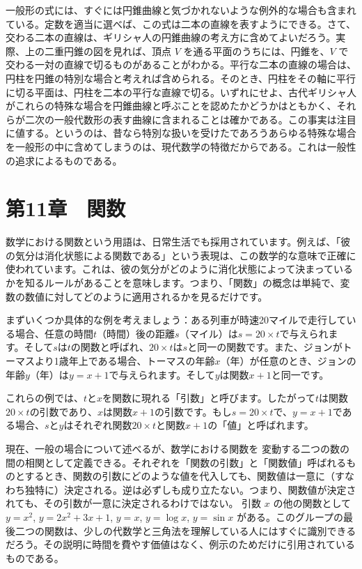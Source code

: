 \documentclass[a4paper,11pt,openany]{ltjsbook}
\begin{document}
一般形の式には、すぐには円錐曲線と気づかれないような例外的な場合も含まれている。定数を適当に選べば、この式は二本の直線を表すようにできる。さて、交わる二本の直線は、ギリシャ人の円錐曲線の考え方に含めてよいだろう。実際、上の二重円錐の図を見れば、頂点 $V$ を通る平面のうちには、円錐を、$V$ で交わる一対の直線で切るものがあることがわかる。平行な二本の直線の場合は、円柱を円錐の特別な場合と考えれば含められる。そのとき、円柱をその軸に平行に切る平面は、円柱を二本の平行な直線で切る。いずれにせよ、古代ギリシャ人がこれらの特殊な場合を円錐曲線と呼ぶことを認めたかどうかはともかく、それらが二次の一般代数形の表す曲線に含まれることは確かである。この事実は注目に値する。というのは、昔なら特別な扱いを受けたであろうあらゆる特殊な場合を一般形の中に含めてしまうのは、現代数学の特徴だからである。これは一般性の追求によるものである。

\chapter{第11章　関数}

数学における関数という用語は、日常生活でも採用されています。例えば、「彼の気分は消化状態による関数である」という表現は、この数学的な意味で正確に使われています。これは、彼の気分がどのように消化状態によって決まっているかを知るルールがあることを意味します。つまり、「関数」の概念は単純で、変数の数値に対してどのように適用されるかを見るだけです。

まずいくつか具体的な例を考えましょう：ある列車が時速20マイルで走行している場合、任意の時間$t$（時間）後の距離$s$（マイル）は$s = 20 × t$で与えられます。そして$s$は$t$の関数と呼ばれ、$20 × t$は$s$と同一の関数です。また、ジョンがトーマスより1歳年上である場合、トーマスの年齢$x$（年）が任意のとき、ジョンの年齢$y$（年）は$y = x + 1$で与えられます。そして$y$は関数$x + 1$と同一です。

これらの例では、$t$と$x$を関数に現れる「引数」と呼びます。したがって$t$は関数$20 × t$の引数であり、$x$は関数$x + 1$の引数です。もし$s = 20 × t$で、$y = x + 1$である場合、$s$と$y$はそれぞれ関数$20 × t$と関数$x + 1$の「値」と呼ばれます。

現在、一般の場合について述べるが、数学における関数を
変動する二つの数の間の相関として定義できる。それぞれを「関数の引数」と「関数値」呼ばれるものとするとき、関数の引数にどのような値を代入しても、関数値は一意に（すなわち独特に）決定される。逆は必ずしも成り立たない。つまり、関数値が決定されても、その引数が一意に決定されるわけではない。
引数 $x$ の他の関数として $y = x^{2}$, $y = 2x^{2} + 3x + 1$, $y = x$, $y = \log x$, $y = \sin x$ がある。このグループの最後二つの関数は、少しの代数学と三角法を理解している人にはすぐに識別できるだろう。その説明に時間を費やす価値はなく、例示のためだけに引用されているものである。
\end{document}
